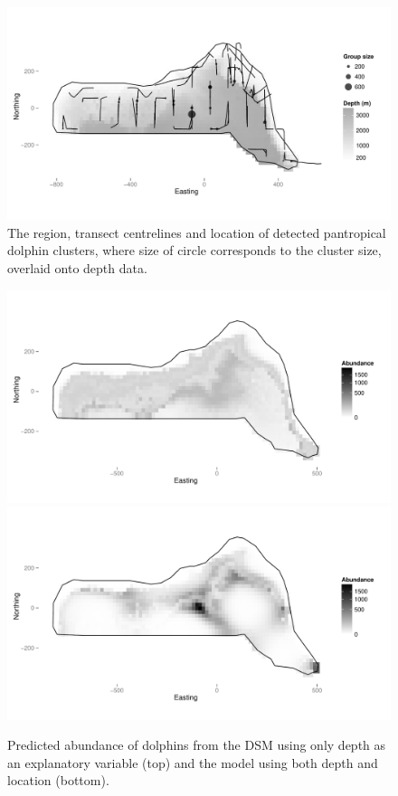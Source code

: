 \documentclass[a4paper,12pt]{article}
\begin{document}
\newpage

\begin{figure}[h!]
  \caption{The region, transect centrelines and location of detected pantropical dolphin clusters, where size of circle corresponds to the cluster size, overlaid onto depth data.}
  \label{dolphin-eda}
  \begin{center}
    \includegraphics[width=\textwidth]{depth-transects}
  \end{center}
\end{figure}

\newpage

\begin{figure}[h!]
  \caption{Predicted abundance of dolphins from the DSM using only depth as an explanatory variable (top) and the model using both depth and location (bottom).}
  \label{fits-depth}
  \begin{center}
    \includegraphics[width=\textwidth]{fit-depth}\\
    \includegraphics[width=\textwidth]{fit-depth-xy}
  \end{center}
\end{figure}
\end{document}
